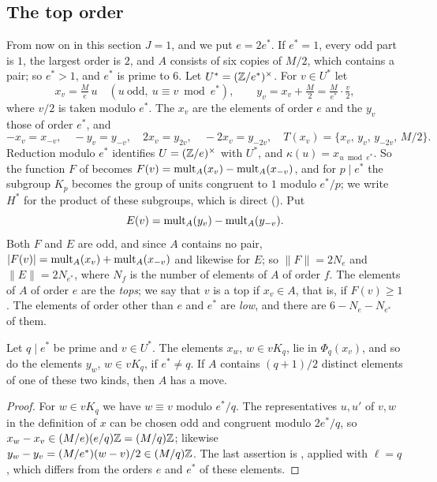 \subsection{The top order}\label{ssec:top}
From now on in this section $J=1$, and we put $e=2e^{*}$. If $e^{*}=1$, every
odd part is $1$, the largest order is $2$, and $A$ consists of six copies of
$M/2$, which contains a pair; so $e^{*}>1$, and $e^{*}$ is prime to $6$. Let
$U^{*}=(\mathbb{Z}/e^{*})^{\times}$. For $v\in U^{*}$ let
\[
  x_{v}=\tfrac{M}{e}\,u\quad(u\ \text{odd},\ u\equiv v\bmod e^{*}),\qquad
  y_{v}=x_{v}+\tfrac M2=\tfrac{M}{e^{*}}\cdot\tfrac{v}{2},
\]
where $v/2$ is taken modulo $e^{*}$. The $x_{v}$ are the elements of order $e$
and the $y_{v}$ those of order $e^{*}$, and
\[
  -x_{v}=x_{-v},\quad -y_{v}=y_{-v},\quad 2x_{v}=y_{2v},\quad
  -2x_{v}=y_{-2v},\quad T(x_{v})=\{x_{v},\,y_{v},\,y_{-2v},\,M/2\}.
\]
Reduction modulo $e^{*}$ identifies $U=(\mathbb{Z}/e)^{\times}$ with $U^{*}$, and
$\kappa(u)=x_{u\bmod e^{*}}$. So the function $F$ of  becomes
$F(v)=\operatorname{mult}_{A}(x_{v})-\operatorname{mult}_{A}(x_{-v})$, and for $p\mid e^{*}$ the subgroup
$K_{p}$ becomes the group of units congruent to $1$ modulo $e^{*}/p$; we
write $H^{*}$ for the product of these subgroups, which is direct
(). Put
\[
  E(v)=\operatorname{mult}_{A}(y_{v})-\operatorname{mult}_{A}(y_{-v}).
\]
Both $F$ and $E$ are odd, and since $A$ contains no pair,
$|F(v)|=\operatorname{mult}_{A}(x_{v})+\operatorname{mult}_{A}(x_{-v})$ and likewise for $E$; so
$\|F\|=2N_{e}$ and $\|E\|=2N_{e^{*}}$, where $N_{f}$ is the number of
elements of $A$ of order $f$. The elements of $A$ of order $e$ are the
\emph{tops}; we say that $v$ is a top if $x_{v}\in A$, that is, if
$F(v)\ge1$. The elements of order other than $e$ and $e^{*}$ are \emph{low},
and there are $6-N_{e}-N_{e^{*}}$ of them.

\begin{lemma}\label{lem:topfibres}
Let $q\mid e^{*}$ be prime and $v\in U^{*}$. The elements $x_{w}$, $w\in
vK_{q}$, lie in $\Phi_{q}(x_{v})$, and so do the elements $y_{w}$, $w\in
vK_{q}$, if $e^{*}\ne q$. If $A$ contains $(q+1)/2$ distinct elements of one
of these two kinds, then $A$ has a move.
\end{lemma}

\begin{proof}
For $w\in vK_{q}$ we have $w\equiv v$ modulo $e^{*}/q$. The representatives
$u,u'$ of $v,w$ in the definition of $x$ can be chosen odd and congruent
modulo $2e^{*}/q$, so $x_{w}-x_{v}\in(M/e)(e/q)\mathbb{Z}=(M/q)\mathbb{Z}$; likewise
$y_{w}-y_{v}=(M/e^{*})(w-v)/2\in(M/q)\mathbb{Z}$. The last assertion is
, applied with $\ell=q$, which differs from the orders $e$
and $e^{*}$ of these elements.
\end{proof}

